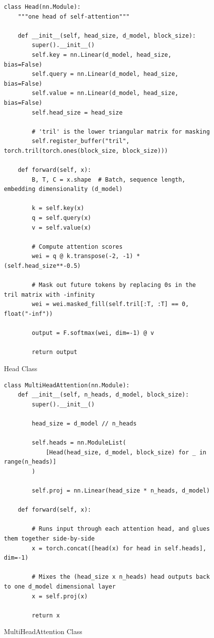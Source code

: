 \documentclass[11pt]{article}
\begin{document}
\begin{figure}[htbp]
	\begin{verbatim}
class Head(nn.Module):
	"""one head of self-attention"""

	def __init__(self, head_size, d_model, block_size):
		super().__init__()
		self.key = nn.Linear(d_model, head_size, bias=False)
		self.query = nn.Linear(d_model, head_size, bias=False)
		self.value = nn.Linear(d_model, head_size, bias=False)
		self.head_size = head_size

		# 'tril' is the lower triangular matrix for masking
		self.register_buffer("tril", torch.tril(torch.ones(block_size, block_size)))

	def forward(self, x):
		B, T, C = x.shape  # Batch, sequence length, embedding dimensionality (d_model)

		k = self.key(x)
		q = self.query(x)
		v = self.value(x)

		# Compute attention scores
		wei = q @ k.transpose(-2, -1) * (self.head_size**-0.5)

		# Mask out future tokens by replacing 0s in the tril matrix with -infinity
		wei = wei.masked_fill(self.tril[:T, :T] == 0, float("-inf"))

		output = F.softmax(wei, dim=-1) @ v

		return output
	\end{verbatim}
	\caption{Head Class}
	\label{Head}
\end{figure}

\begin{figure}[htbp]
	\begin{verbatim}
class MultiHeadAttention(nn.Module):
    def __init__(self, n_heads, d_model, block_size):
        super().__init__()

        head_size = d_model // n_heads

        self.heads = nn.ModuleList(
            [Head(head_size, d_model, block_size) for _ in range(n_heads)]
        )

        self.proj = nn.Linear(head_size * n_heads, d_model)

    def forward(self, x):

        # Runs input through each attention head, and glues them together side-by-side
        x = torch.concat([head(x) for head in self.heads], dim=-1)

        # Mixes the (head_size x n_heads) head outputs back to one d_model dimensional layer
        x = self.proj(x)

        return x
	\end{verbatim}
	\caption{MultiHeadAttention Class}
\end{figure}
\end{document}
